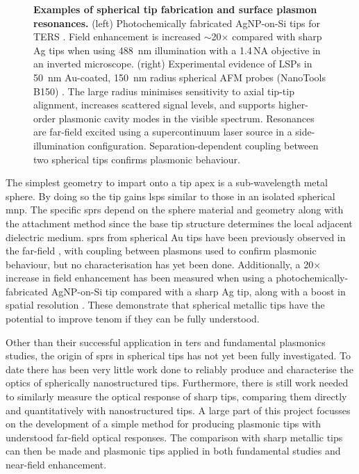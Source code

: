 \documentclass{article}
\begin{document}
\begin{figure}[bt]
\begin{subfigure}[t]{0.6\textwidth}
\end{subfigure}
\caption[Examples of spherical tip fabrication and surface plasmon resonances]{\textbf{Examples of spherical tip fabrication and surface plasmon resonances.} (left) Photochemically fabricated AgNP-on-Si tips for TERS \cite{umakoshi2012}. Field enhancement is increased $\sim$20$\times$ compared with sharp Ag tips when using \SI{488}{nm} illumination with a 1.4\,NA objective in an inverted microscope. (right) Experimental evidence of LSPs in \SI{50}{nm} Au-coated, \SI{150}{nm} radius spherical AFM probes (NanoTools B150) \cite{savage2012}. The large radius minimises sensitivity to axial tip-tip alignment, increases scattered signal levels, and supports higher-order plasmonic cavity modes in the visible spectrum. Resonances are far-field excited using a supercontinuum laser source in a side-illumination configuration. Separation-dependent coupling between two spherical tips confirms plasmonic behaviour.}
\label{fig:savage2012a}
\end{figure}

The simplest geometry to impart onto a tip apex is a sub-wavelength metal sphere. By doing so the tip gains \glspl{lsp} similar to those in an isolated spherical \gls{mnp}. The specific \glspl{spr} depend on the sphere material and geometry along with the attachment method since the base tip structure determines the local adjacent dielectric medium. \Glspl{spr} from spherical Au tips have been previously observed in the far-field \cite{savage2012}, with coupling between plasmons used to confirm plasmonic behaviour, but no characterisation has yet been done. Additionally, a 20$\times$ increase in field enhancement has been measured when using a photochemically-fabricated AgNP-on-Si tip compared with a sharp Ag tip, along with a boost in spatial resolution \cite{umakoshi2012}. These demonstrate that spherical metallic tips have the potential to improve \gls{tenom} if they can be fully understood.

Other than their successful application in \gls{ters} and fundamental plasmonics studies, the origin of \glspl{spr} in spherical tips has not yet been fully investigated. To date there has been very little work done to reliably produce and characterise the optics of spherically nanostructured tips. Furthermore, there is still work needed to similarly measure the optical response of sharp tips, comparing them directly and quantitatively with nanostructured tips. A large part of this project focusses on the development of a simple method for producing plasmonic tips with understood far-field optical responses. The comparison with sharp metallic tips can then be made and plasmonic tips applied in both fundamental studies and near-field enhancement.
\end{document}

